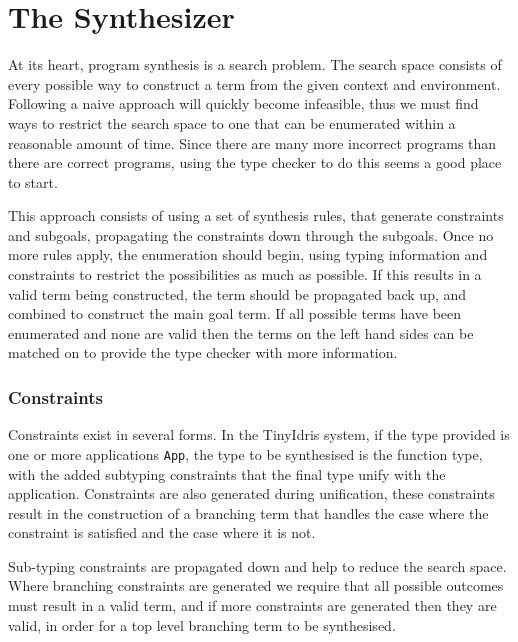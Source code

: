 \documentclass[a4paper]{article}
\begin{document}
\section{The Synthesizer}
\label{sec:org83118ab}
At its heart, program synthesis is a search problem. The search space consists of every possible way to
construct a term from the given context and environment. Following a naive approach will quickly become infeasible, 
thus we must find ways to restrict the search space to one that can be enumerated within a reasonable amount of time. Since there are 
many more incorrect programs than there are correct programs, using the type checker to do this seems a good place 
to start. 

This approach consists of using a set of synthesis rules, that generate constraints 
and subgoals, propagating the constraints down through the subgoals. Once no more rules apply, the enumeration should begin, using 
typing information and constraints to restrict the possibilities as much as possible. If this results in a valid term being constructed, the term should be 
propagated back up, and combined to construct the main goal term. If all possible terms have been enumerated and none are valid then 
the terms on the left hand sides can be matched on to provide the type checker with more information. 

\subsubsection{Constraints}
\label{sec:org44a54fc}
Constraints exist in several forms. In the TinyIdris system, if the type provided is one or more  
applications \texttt{App}, the type to be synthesised is the function type, with the added subtyping constraints that the final type unify with
the application. Constraints are also generated during unification, these constraints result in the construction of a 
branching term that handles the case where the constraint is satisfied and the case where it is not. 

Sub-typing constraints are propagated down and help to reduce the search space. Where branching constraints are 
generated we require that all possible outcomes must result in a valid term, and if more constraints are generated
then they are valid, in order for a top level branching term to be synthesised.
\end{document}

